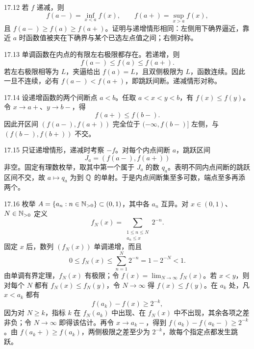\begin{solution}{17.12}
若 \(f\) 递减，则
\[
 f(a-)=\inf_{x<a}f(x),\qquad
 f(a+)=\sup_{x>a}f(x),
\]
且 \(f(a-)\ge f(a)\ge f(a+)\)。证明与递增情形相同：左侧用下确界逼近，靠近 \(a\) 时函数值被夹在下确界与某个已选左点值之间；右侧对称。
\end{solution}

\begin{solution}{17.13}
单调函数在内点的有限左右极限都存在。若递增，则
\[
 f(a-)\le f(a)\le f(a+).
\]
若左右极限相等为 \(L\)，夹逼给出 \(f(a)=L\)，且双侧极限为 \(L\)，函数连续。因此一旦不连续，必有 \(f(a-)<f(a+)\)，即跳跃间断。递减情形对称。
\end{solution}

\begin{solution}{17.14}
设递增函数的两个间断点 \(a<b\)。任取 \(a<x<y<b\)，有 \(f(x)\le f(y)\)。令 \(x\to a+\)、\(y\to b-\)，得
\[
 f(a+)\le f(b-).
\]
因此开区间 \((f(a-),f(a+))\) 完全位于 \((-\infty,f(b-)]\) 左侧，与 \((f(b-),f(b+))\) 不交。
\end{solution}

\begin{solution}{17.15}
只证递增情形，递减时考察 \(-f\)。对每个内点间断 \(a\)，跳跃区间
\[
 J_a=(f(a-),f(a+))
\]
非空。固定有理数枚举，取其中第一个属于 \(J_a\) 的数 \(q_a\)。表明不同内点间断的跳跃区间不交，故 \(a\mapsto q_a\) 为到 \(\mathbb{Q}\) 的单射。于是内点间断集至多可数，端点至多再添两个。
\end{solution}

\begin{solution}{17.16}
枚举 \(A=\{a_n:n\in\mathbb{N}_{>0}\}\subset(0,1)\)，其中各 \(a_n\) 互异。对 \(x\in(0,1)\)、\(N\in\mathbb{N}_{>0}\) 定义
\[
 f_N(x)=\sum_{\substack{1\le n\le N\\a_n\le x}}2^{-n}.
\]
固定 \(x\) 后，数列 \((f_N(x))\) 单调递增，而且
\[
 0\le f_N(x)\le \sum_{n=1}^{N}2^{-n}=1-2^{-N}<1.
\]
由单调有界定理，\(f_N(x)\) 有极限；令 \(f(x)=\lim_{N\to\infty}f_N(x)\)。若 \(x<y\)，则对每个 \(N\) 都有 \(f_N(x)\le f_N(y)\)，令 \(N\to\infty\) 得 \(f(x)\le f(y)\)。在 \(a_k\) 处，凡 \(x<a_k\) 都有
\[
 f(a_k)-f(x)\ge 2^{-k},
\]
因为对 \(N\ge k\)，指标 \(k\) 在 \(f_N(a_k)\) 中出现、在 \(f_N(x)\) 中不出现，其余各项之差非负；令 \(N\to\infty\) 即得该估计。再令 \(x\to a_k-\)，得到
\(f(a_k)-f(a_k-)\ge2^{-k}\)。由 \(f(a_k+)\ge f(a_k)\)，两侧极限之差至少为 \(2^{-k}\)，故每个指定点都发生跳跃。
\end{solution}

